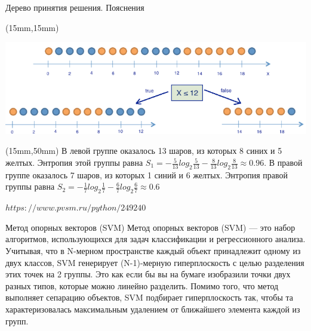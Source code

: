 \documentclass{beamer}
\begin{document}
\begin{frame}{Дерево принятия решения. Пояснения}

\begin{textblock*}{120mm}(15mm,15mm)

\includegraphics[scale=0.35]{ris_03.png}

\end{textblock*} 

\begin{textblock*}{90mm}(15mm,50mm)
В левой группе оказалось 13 шаров, из которых 8 синих и 5 желтых. 
Энтропия этой группы равна
 $S_1=-\frac{5}{13}log_2{\frac{5}{13}}-\frac{8}{13}log_2{\frac{8}{13}} \approx 0.96$. 
В правой группе оказалось 7 шаров, из которых 1 синий и 6 желтых. 
Энтропия правой группы равна 
$S_2=-\frac{1}{7}log_2{\frac{1}{7}}-\frac{6}{7}log_2{\frac{6}{7}} \approx 0.6$

$https://www.pvsm.ru/python/249240$
\end{textblock*} 


\end{frame}

\begin{frame}{Метод опорных векторов (SVM) }
Метод опорных векторов (SVM) — это набор алгоритмов, использующихся для задач классификации и регрессионного анализа. 
Учитывая, что в N-мерном пространстве каждый объект принадлежит одному из двух классов, SVM генерирует (N-1)-мерную 
гиперплоскость с целью разделения этих точек на 2 группы. Это как если бы вы на бумаге изобразили точки двух разных 
типов, которые можно линейно разделить. Помимо того, что метод выполняет сепарацию объектов, SVM подбирает 
гиперплоскость так, чтобы та характеризовалась максимальным удалением от ближайшего элемента каждой из групп.
\end{frame}
\end{document}
